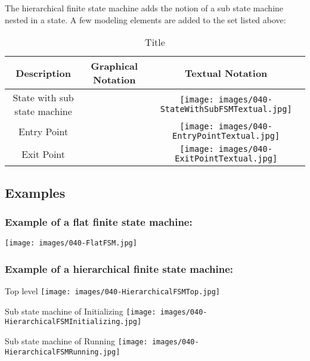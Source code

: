 The hierarchical finite state machine adds the notion of a sub state machine nested in a state.
A few modeling elements are added to the set listed above:

\begin{table}
\caption{Title}
\begin{tabular}{|c|c|c|}
\hline
 \textbf{Description} & \textbf{Graphical Notation} & \textbf{Textual Notation} \\ \hline
 State with sub state machine &  & \texttt{[image: images/040-StateWithSubFSMTextual.jpg]} \\ \hline
 Entry Point & & \texttt{[image: images/040-EntryPointTextual.jpg]} \\ \hline
 Exit Point & & \texttt{[image: images/040-ExitPointTextual.jpg]} \\ \hline
\end{tabular}
\end{table}



\subsection{Examples}

\subsubsection{Example of a flat finite state machine:}

\texttt{[image: images/040-FlatFSM.jpg]}

\subsubsection{Example of a hierarchical finite state machine:}

Top level
\texttt{[image: images/040-HierarchicalFSMTop.jpg]}

Sub state machine of Initializing
\texttt{[image: images/040-HierarchicalFSMInitializing.jpg]}

Sub state machine of Running
\texttt{[image: images/040-HierarchicalFSMRunning.jpg]}